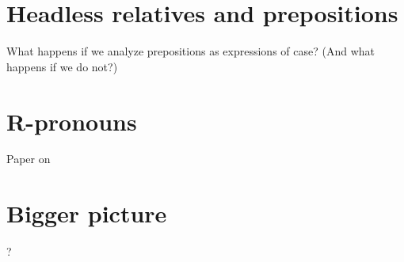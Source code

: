 

  \section{Headless relatives and prepositions}
What happens if we analyze prepositions as expressions of case? (And what happens if we do not?)

  \section{R-pronouns}
Paper on 

  \section{Bigger picture}
?
